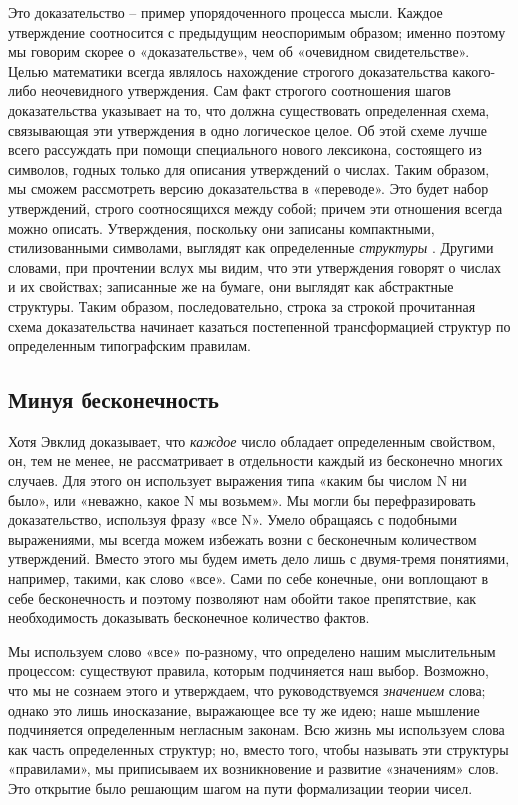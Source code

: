 \documentclass[../main.tex]{subfiles}
\begin{document}
Это доказательство \--- пример упорядоченного процесса мысли. Каждое утверждение соотносится с предыдущим неоспоримым образом; именно поэтому мы говорим скорее о «доказательстве», чем об «очевидном свидетельстве». Целью математики всегда являлось нахождение строгого доказательства какого-либо неочевидного утверждения. Сам факт строгого соотношения шагов доказательства указывает на то, что должна существовать определенная схема, связывающая эти утверждения в одно логическое целое. Об этой схеме лучше всего рассуждать при помощи специального нового лексикона, состоящего из символов, годных только для описания утверждений о числах. Таким образом, мы сможем рассмотреть версию доказательства в «переводе». Это будет набор утверждений, строго соотносящихся между собой; причем эти отношения всегда можно описать. Утверждения, поскольку они записаны компактными, стилизованными символами, выглядят как определенные \emph{структуры} . Другими словами, при прочтении вслух мы видим, что эти утверждения говорят о числах и их свойствах; записанные же на бумаге, они выглядят как абстрактные структуры. Таким образом, последовательно, строка за строкой прочитанная схема доказательства начинает казаться постепенной трансформацией структур по определенным типографским правилам.


\subsection{Минуя бесконечность}

Хотя Эвклид доказывает, что \emph{каждое} число обладает определенным свойством, он, тем не менее, не рассматривает в отдельности каждый из бесконечно многих случаев. Для этого он использует выражения типа «каким бы числом N ни было», или «неважно, какое N мы возьмем». Мы могли бы перефразировать доказательство, используя фразу «все N». Умело обращаясь с подобными выражениями, мы всегда можем избежать возни с бесконечным количеством утверждений. Вместо этого мы будем иметь дело лишь с двумя-тремя понятиями, например, такими, как слово «все». Сами по себе конечные, они воплощают в себе бесконечность и поэтому позволяют нам обойти такое препятствие, как необходимость доказывать бесконечное количество фактов.

Мы используем слово «все» по-разному, что определено нашим мыслительным процессом: существуют правила, которым подчиняется наш выбор. Возможно, что мы не сознаем этого и утверждаем, что руководствуемся \emph{значением} слова; однако это лишь иносказание, выражающее все ту же идею; наше мышление подчиняется определенным негласным законам. Всю жизнь мы используем слова как часть определенных структур; но, вместо того, чтобы называть эти структуры «правилами», мы приписываем их возникновение и развитие «значениям» слов. Это открытие было решающим шагом на пути формализации теории чисел.
\end{document}
